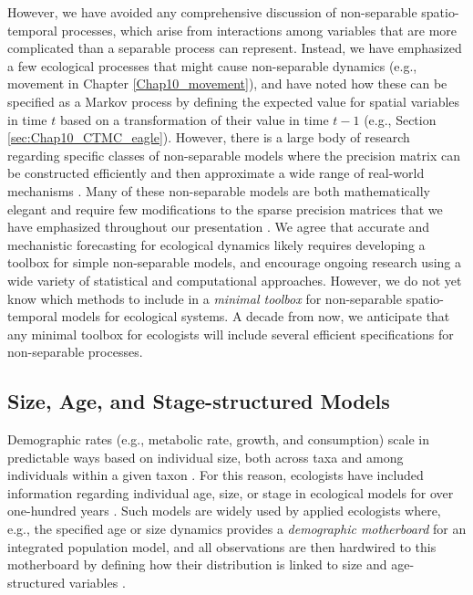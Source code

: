 However, we have avoided any comprehensive discussion of non-separable spatio-temporal processes, which arise from interactions among variables that are more complicated than a separable process can represent.  Instead, we have emphasized a few ecological processes that might cause non-separable dynamics (e.g., movement in Chapter \ref{Chap10_movement}), and have noted how these can be specified as a Markov process by defining the expected value for spatial variables in time \(t\) based on a transformation of their value in time \(t-1\) (e.g., Section \ref{sec:Chap10_CTMC_eagle}).  However, there is a large body of research regarding specific classes of non-separable models where the precision matrix can be constructed efficiently and then approximate a wide range of real-world mechanisms \cite{prates_non-separable_2022}.  Many of these non-separable models are both mathematically elegant and require few modifications to the sparse precision matrices that we have emphasized throughout our presentation \cite{lindgren_diffusion-based_2023}.  We agree that accurate and mechanistic forecasting for ecological dynamics likely requires developing a toolbox for simple non-separable models, and encourage ongoing research using a wide variety of statistical and computational approaches.  However, we do not yet know which methods to include in a \textit{minimal toolbox} for non-separable spatio-temporal models for ecological systems.  A decade from now, we anticipate that any minimal toolbox for ecologists will include several efficient specifications for non-separable processes.     

\subsection{Size, Age, and Stage-structured Models}

Demographic rates (e.g., metabolic rate, growth, and consumption) scale in predictable ways based on individual size, both across taxa and among individuals within a given taxon \cite{brown_toward_2004}. For this reason, ecologists have included information regarding individual age, size, or stage in ecological models for over one-hundred years \cite{lotka_relation_1907}.  Such models are widely used by applied ecologists where, e.g., the specified age or size dynamics provides a \textit{demographic motherboard} for an integrated population model, and all observations are then hardwired to this motherboard by defining how their distribution is linked to size and age-structured variables \cite{kery_integrated_2021}. 

